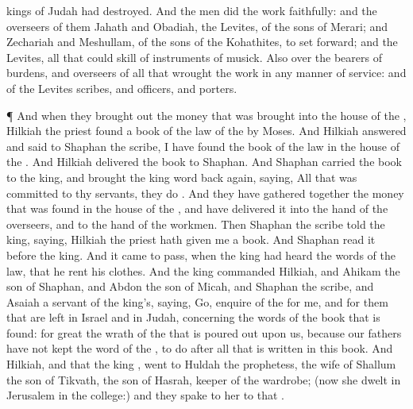 {kings of
Judah had
destroyed.
And the
men
did the
work
faithfully: and the
overseers of them
{}
Jahath and
Obadiah, the
Levites, of the
sons of
Merari; and
Zechariah and
Meshullam, of the sons of the
Kohathites, to set
{}
forward; and
{} the
Levites, all that could
skill of
instruments of
musick.
Also
{} over the bearers of
burdens, and
{}
overseers of all that
wrought the
work in any manner of
service: and of the
Levites
{}
scribes, and
officers, and
porters.
\par }{\PP {}¶ And when they brought
out the
money that was brought
into the
house of the
{},
Hilkiah the
priest
found a
book of the
law of the
{}
{}
by
Moses.
And
Hilkiah
answered and
said to
Shaphan the
scribe, I have
found the
book of the
law in the
house of the
{}. And
Hilkiah
delivered the
book to
Shaphan.
And
Shaphan
carried the
book to the
king, and
brought the
king
word
back again,
saying, All that was
committed
to thy
servants, they
do
{}.
And they have gathered
together the
money that was
found in the
house of the
{}, and have
delivered it into the
hand of the
overseers, and to the
hand of the
workmen.
Then
Shaphan the
scribe
told the
king,
saying,
Hilkiah the
priest hath
given me a
book. And
Shaphan
read it
before the
king.
And it came to pass, when the
king had
heard the
words of the
law, that he
rent his
clothes.
And the
king
commanded
Hilkiah, and
Ahikam the
son of
Shaphan, and
Abdon the
son of
Micah, and
Shaphan the
scribe, and
Asaiah a
servant of the
king’s,
saying,
Go,
enquire of the
{} for me, and for them that are
left in
Israel and in
Judah, concerning the
words of the
book that is
found: for
great
{} the
wrath of the
{} that is poured
out upon us, because our
fathers have not
kept the
word of the
{}, to
do after all that is
written in this
book.
And
Hilkiah, and
{} that the
king
{},
went to
Huldah the
prophetess, the
wife of
Shallum the
son of
Tikvath, the
son of
Hasrah,
keeper of the
wardrobe; (now she
dwelt in
Jerusalem in the
college:) and they
spake to her to that
{}.}
